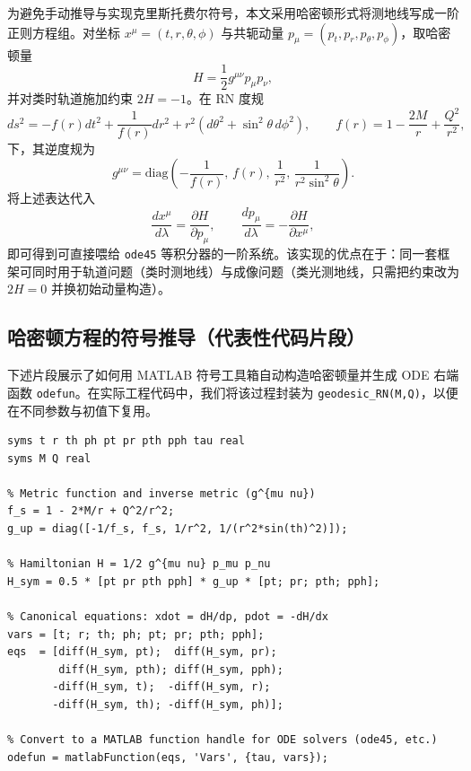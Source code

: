 \documentclass[a4paper,12pt]{article}
\begin{document}
为避免手动推导与实现克里斯托费尔符号，本文采用哈密顿形式将测地线写成一阶正则方程组。对坐标 $x^\mu=(t,r,\theta,\phi)$ 与共轭动量 $p_\mu=(p_t,p_r,p_\theta,p_\phi)$，取哈密顿量
\begin{equation}
H=\frac{1}{2}g^{\mu\nu}p_\mu p_\nu,
\end{equation}
并对类时轨道施加约束 $2H=-1$。在 RN 度规
\begin{equation}
ds^2=-f(r)dt^2+\frac{1}{f(r)}dr^2+r^2(d\theta^2+\sin^2\theta\,d\phi^2),\qquad
f(r)=1-\frac{2M}{r}+\frac{Q^2}{r^2},
\end{equation}
下，其逆度规为
\begin{equation}
g^{\mu\nu}=\mathrm{diag}\!\left(-\frac{1}{f(r)},\,f(r),\,\frac{1}{r^2},\,\frac{1}{r^2\sin^2\theta}\right).
\end{equation}
将上述表达代入
\begin{equation}
\frac{dx^\mu}{d\lambda}=\frac{\partial H}{\partial p_\mu},
\qquad
\frac{dp_\mu}{d\lambda}=-\frac{\partial H}{\partial x^\mu},
\end{equation}
即可得到可直接喂给 \texttt{ode45} 等积分器的一阶系统。该实现的优点在于：同一套框架可同时用于轨道问题（类时测地线）与成像问题（类光测地线，只需把约束改为 $2H=0$ 并换初始动量构造）。

\subsection{哈密顿方程的符号推导（代表性代码片段）}

下述片段展示了如何用 MATLAB 符号工具箱自动构造哈密顿量并生成 ODE 右端函数 \texttt{odefun}。在实际工程代码中，我们将该过程封装为 \texttt{geodesic\_RN(M,Q)}，以便在不同参数与初值下复用。

\begin{lstlisting}[caption={RN 时空：哈密顿方程符号推导与 ODE 生成（代表性实现）}, label={lst:rn_hamilton_symbolic}]
% Define symbolic variables
syms t r th ph pt pr pth pph tau real
syms M Q real

% Metric function and inverse metric (g^{mu nu})
f_s = 1 - 2*M/r + Q^2/r^2;
g_up = diag([-1/f_s, f_s, 1/r^2, 1/(r^2*sin(th)^2)]);

% Hamiltonian H = 1/2 g^{mu nu} p_mu p_nu
H_sym = 0.5 * [pt pr pth pph] * g_up * [pt; pr; pth; pph];

% Canonical equations: xdot = dH/dp, pdot = -dH/dx
vars = [t; r; th; ph; pt; pr; pth; pph];
eqs  = [diff(H_sym, pt);  diff(H_sym, pr);
        diff(H_sym, pth); diff(H_sym, pph);
       -diff(H_sym, t);  -diff(H_sym, r);
       -diff(H_sym, th); -diff(H_sym, ph)];

% Convert to a MATLAB function handle for ODE solvers (ode45, etc.)
odefun = matlabFunction(eqs, 'Vars', {tau, vars});
\end{lstlisting}
\end{document}
